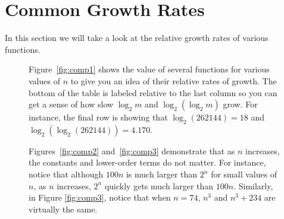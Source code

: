 \newpage

\section{Common Growth Rates}\label{sec:growrates}
In this section we will take a look at the relative growth rates of various functions.

\noindent
\begin{figure}[h]
\begin{minipage}{.5\textwidth}
Figure~\ref{fig:comp1} shows the value of several functions for various values
of $n$ to give you an idea of their relative rates of growth.  
The bottom of the table is labeled relative to the last column 
so you can get a sense of how slow $\log_2 m$ and $\log_2(\log_2 m)$ grow.
For instance, the final row is showing that 
$\log_2(262144) = 18$ and 
$\log_2(\log_2 (262144) ) = 4.170$.

Figures~\ref{fig:comp2} and~\ref{fig:comp3} demonstrate that as $n$ increases, 
the constants and lower-order terms do not matter.
For instance, notice that although $100n$ is much larger than $2^n$ for small values of $n$,
as $n$ increases, $2^n$ quickly gets much larger than $100n$. 
Similarly, in Figure \ref{fig:comp3}, notice that when $n=74$, $n^3$ and $n^3+234$ are virtually
the same.


\end{minipage}
\end{figure}
